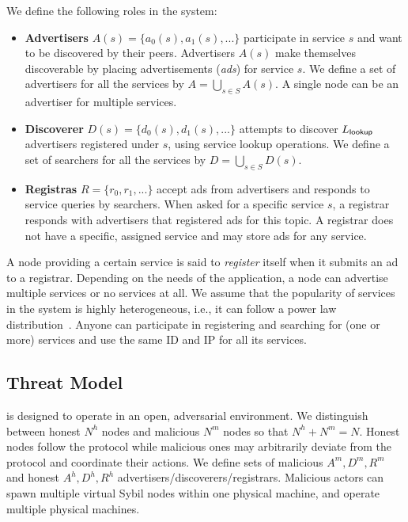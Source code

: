 We define the following roles in the system:
\begin{itemize}
    \item \textbf{Advertisers} $A(s) = \{a_0(s), a_1(s),...\}$ participate in service $s$ and want to be discovered by their peers.
    Advertisers $A(s)$ make themselves discoverable by placing advertisements (\emph{ads}) for service $s$. We define a set of advertisers for all the services by $A = \bigcup_{s \in S} A(s)$.
    A single node can be an advertiser for multiple services.
    \item \textbf{Discoverer} $D(s) = \{d_0(s), d_1(s),...\}$ attempts to discover $L_{\mathsf{lookup}}$ advertisers registered under $s$, using service lookup operations. We define a set of searchers for all the services by $D = \bigcup_{s \in S} D(s)$.
    \item \textbf{Registras} $R = \{r_0, r_1,...\}$ accept ads from advertisers and responds to service queries by searchers. 
    When asked for a specific service $s$, a registrar responds with advertisers that registered ads for this topic.
    A registrar does not have a specific, assigned service and may store ads for any service.
\end{itemize}

A node providing a certain service is said to \emph{register} itself when it submits an ad to a registrar. %
Depending on the needs of the application, a node can advertise multiple services or no services at all. 
We assume that the popularity of services in the system is highly heterogeneous, i.e., it can follow a power law distribution~\cite{kim2018measuring}.
Anyone can participate in registering and searching for (one or more) services and use the same ID and IP for all its services. 

\subsection{Threat Model}
\label{sec:threat}
\sysname is designed to operate in an open, adversarial environment.
We distinguish between honest $N^h$ nodes and malicious $N^m$ nodes so that $N^h + N^m = N$.
Honest nodes follow the protocol while malicious ones may arbitrarily deviate from the protocol and coordinate their actions. We define sets of malicious $A^m, D^m, R^m$ and honest $A^h, D^h, R^h$ advertisers/discoverers/registrars. 
Malicious actors can spawn multiple virtual Sybil nodes within one physical machine, and operate multiple physical machines.



